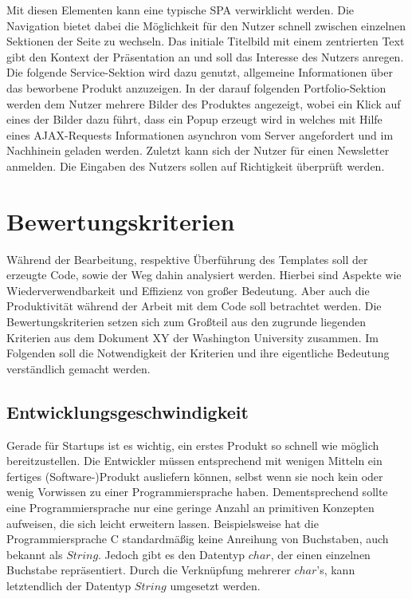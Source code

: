 Mit diesen Elementen kann eine typische SPA verwirklicht werden. Die Navigation bietet dabei die Möglichkeit für den Nutzer schnell zwischen einzelnen Sektionen der Seite zu wechseln. Das initiale Titelbild mit einem zentrierten Text gibt den Kontext der Präsentation an und soll das Interesse des Nutzers anregen. Die folgende Service-Sektion wird dazu genutzt, allgemeine Informationen über das beworbene Produkt anzuzeigen. In der darauf folgenden Portfolio-Sektion werden dem Nutzer mehrere Bilder des Produktes angezeigt, wobei ein Klick auf eines der Bilder dazu führt, dass ein Popup erzeugt wird in welches mit Hilfe eines AJAX-Requests Informationen asynchron vom Server angefordert und im Nachhinein geladen werden. Zuletzt kann sich der Nutzer für einen Newsletter anmelden. Die Eingaben des Nutzers sollen auf Richtigkeit überprüft werden.


\section{Bewertungskriterien}
\label{sec:Bewertungskriterien}
Während der Bearbeitung, respektive Überführung des Templates soll der erzeugte Code, sowie der Weg dahin analysiert werden. Hierbei sind Aspekte wie Wiederverwendbarkeit und Effizienz von großer Bedeutung. Aber auch die Produktivität während der Arbeit mit dem Code soll betrachtet werden. Die Bewertungskriterien setzen sich zum Großteil aus den zugrunde liegenden Kriterien aus dem Dokument XY der Washington University zusammen. Im Folgenden soll die Notwendigkeit der Kriterien und ihre eigentliche Bedeutung verständlich gemacht werden.

\subsection{Entwicklungsgeschwindigkeit}
\label{sec:Entwicklungsgeschwindigkeit}
Gerade für Startups ist es wichtig, ein erstes Produkt so schnell wie möglich bereitzustellen. Die Entwickler müssen entsprechend mit wenigen Mitteln ein fertiges (Software-)Produkt ausliefern können, selbst wenn sie noch kein oder wenig Vorwissen zu einer Programmiersprache haben.
Dementsprechend sollte eine Programmiersprache nur eine geringe Anzahl an primitiven Konzepten aufweisen, die sich leicht erweitern lassen. Beispielsweise hat die Programmiersprache C standardmäßig keine Anreihung von Buchstaben, auch bekannt als $String$. Jedoch gibt es den Datentyp $char$, der einen einzelnen Buchstabe repräsentiert. Durch die Verknüpfung mehrerer $char$'s, kann letztendlich der Datentyp $String$ umgesetzt werden.


